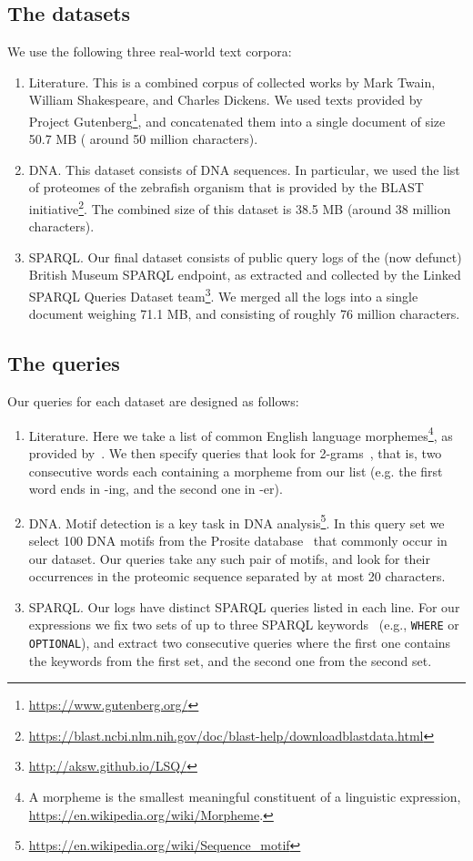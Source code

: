 \subsection{The datasets}
We use the following three real-world text corpora:
\begin{enumerate}
	\item \textsf{Literature.}  This is a combined corpus of collected works by
	Mark Twain, William Shakespeare, and Charles Dickens. We used texts provided
	by Project Gutenberg\footnote{\url{https://www.gutenberg.org/}}, and
	concatenated them into a single document of size 50.7 MB ( around 50 million
	characters).
	\item \textsf{DNA.} This dataset consists of DNA sequences. In particular,
	we used the list of proteomes of the zebrafish organism that is provided by
	the BLAST
	initiative\footnote{\url{https://blast.ncbi.nlm.nih.gov/doc/blast-help/downloadblastdata.html}}.
	The combined size of this dataset is 38.5 MB (around 38 million characters).
	\item \textsf{SPARQL.} Our final dataset consists of public query logs of
	the (now defunct) British Museum SPARQL endpoint, as extracted and collected
	by the Linked SPARQL Queries Dataset
	team\footnote{\url{http://aksw.github.io/LSQ/}}. We merged all the logs into
	a single document weighing 71.1 MB, and consisting of roughly 76 million
	characters.
\end{enumerate}

\subsection{The queries}
Our queries for each dataset are designed as follows:
\begin{enumerate}
	\item \textsf{Literature.} Here we take a list of common English language
	morphemes\footnote{A morpheme is the smallest meaningful constituent of a
	linguistic expression, \url{https://en.wikipedia.org/wiki/Morpheme}.}, as
	provided by~\citet{morphemes}. We then specify queries that look for
	2-grams~\citep{morphemes}, that is, two consecutive words each containing a
	morpheme from our list (e.g. the first word ends in -ing, and the second one
	in -er).
	\item \textsf{DNA.} Motif detection is a key task in DNA
	analysis\footnote{\url{https://en.wikipedia.org/wiki/Sequence_motif}}. In
	this query set we select 100 DNA motifs from the Prosite
	database~\citep{prosite} that commonly occur in our dataset. Our queries
	take any such pair of motifs, and look for their occurrences in the
	proteomic sequence separated by at most 20 characters.
	\item \textsf{SPARQL.} Our  logs have distinct SPARQL queries listed in each
	line. For our expressions we fix two sets of up to three SPARQL
	keywords~\citep{sparql11} (e.g., \texttt{WHERE} or \texttt{OPTIONAL}), and
	extract two consecutive queries where the first one contains the keywords
	from the first set, and the second one from the second set. 
\end{enumerate}

